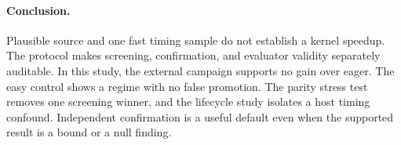 \paragraph{Conclusion.}
Plausible source and one fast timing sample do not establish a kernel speedup.
The protocol makes screening, confirmation, and evaluator validity separately
auditable. In this study, the external campaign supports no gain over eager. The
easy control shows a regime with no false promotion. The parity stress test
removes one screening winner, and the lifecycle study isolates a host timing
confound. Independent confirmation is a useful default even when the supported
result is a bound or a null finding.
